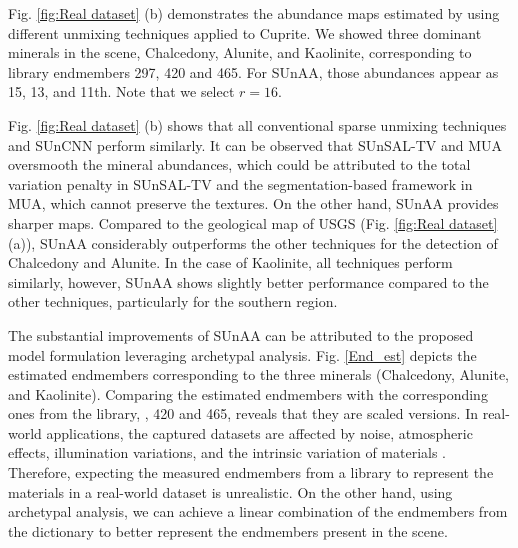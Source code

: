 Fig. \ref{fig:Real dataset} (b) demonstrates the abundance maps estimated by using different unmixing techniques applied to Cuprite. We showed three dominant minerals in the scene, \ie Chalcedony, Alunite, and Kaolinite, corresponding to library endmembers 297, 420 and 465. For SUnAA, those abundances appear as 15, 13, and 11th. Note that we select $r=16$.  

Fig. \ref{fig:Real dataset} (b) shows that all conventional sparse unmixing techniques and SUnCNN perform similarly. It can be observed that SUnSAL-TV and MUA oversmooth the mineral abundances, which could be attributed to the total variation penalty in SUnSAL-TV and the segmentation-based framework in MUA, which cannot preserve the textures. On the other hand, SUnAA provides sharper maps. Compared to the geological map of USGS (Fig. \ref{fig:Real dataset} (a)), SUnAA considerably outperforms the other techniques for the detection of Chalcedony and Alunite. In the case of Kaolinite, all techniques perform similarly, however, SUnAA shows slightly better performance compared to the other techniques, particularly for the southern region. 

The substantial improvements of SUnAA can be attributed to the proposed model formulation leveraging archetypal analysis. Fig. \ref{End_est} depicts the estimated endmembers corresponding to the three minerals (Chalcedony, Alunite, and Kaolinite). Comparing the estimated endmembers with the corresponding ones from the library, , 420 and 465, reveals that they are scaled versions. In real-world applications, the captured datasets are affected by noise, atmospheric effects, illumination variations, and the intrinsic variation of materials \cite{borsoi_spectral_2021}. Therefore, expecting the measured endmembers from a library to represent the materials in a real-world dataset is unrealistic. On the other hand, using archetypal analysis, we can achieve a linear combination of the endmembers from the dictionary to better represent the endmembers present in the scene.  

